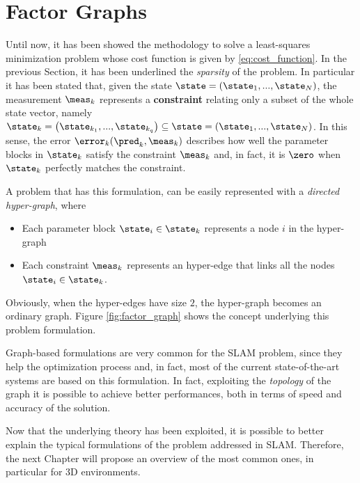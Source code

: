 \section{Factor Graphs}\label{sec:factor_graph}
Until now, it has been showed the methodology to solve a least-squares minimization problem whose cost function is given by \ref{eq:cost_function}. In the previous Section, it has been underlined the \textit{sparsity} of the problem. In particular it has been stated that, given the state $\state = \left(\state_1, ..., \state_N\right)$, the measurement $\meas_k$ represents a \textbf{constraint} relating only a subset of the whole state vector, namely $\state_k = \left(\state_{k_1}, ..., \state_{k_q}\right) \subseteq \state = \left(\state_1, ..., \state_N\right)$. In this sense, the error $\error_k(\pred_k, \meas_k)$ describes how well the parameter blocks in $\state_k$ satisfy the constraint $\meas_k$ and, in fact, it is $\zero$ when $\state_k$ perfectly matches the constraint.

A problem that has this formulation, can be easily represented with a \textit{directed hyper-graph}, where

\begin{itemize}
    \item Each parameter block $\state_i \in \state_k$ represents a node $i$ in the hyper-graph
    \item Each constraint $\meas_k$ represents an hyper-edge that links all the nodes $\state_i \in \state_k$.
\end{itemize}

\noindent Obviously, when the hyper-edges have size $2$, the hyper-graph becomes an ordinary graph. Figure \ref{fig:factor_graph} shows the concept underlying this problem formulation.

Graph-based formulations are very common for the SLAM problem, since they help the optimization process and, in fact, most of the current state-of-the-art systems are based on this formulation. In fact, exploiting the \textit{topology} of the graph it is possible to achieve better performances, both in terms of speed and accuracy of the solution.

\vspace{15px}

Now that the underlying theory has been exploited, it is possible to better explain the typical formulations of the problem addressed in SLAM. Therefore, the next Chapter will propose an overview of the most common ones, in particular for 3D environments.